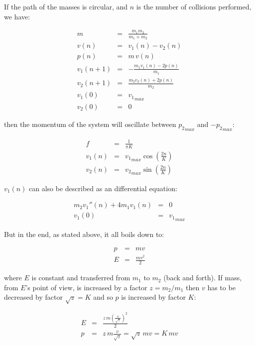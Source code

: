 \documentclass[]{../common/elementary-physics}
\begin{document}
If the path of the masses is circular, and $n$ is the number of collisions performed, we have:

\begin{eqnarray}
m &=& \frac{m_1 m_2}{m_1 + m_2} \\
v(n) &=& v_1(n) - v_2(n) \\
p(n) &=& m \, v(n) \\
v_1(n+1) &=& -\frac{m_1 v_1(n) - 2p(n)}{m_1} \\
v_2(n+1) &=& \frac{m_2 v_2(n) + 2p(n)}{m_2} \\
v_1(0) &=& {v_1}_{max} \\
v_2(0) &=& 0
\end{eqnarray}

then the momentum of the system will oscillate between ${p_2}_{max}$ and $-{p_2}_{max}$:

\begin{eqnarray}
f &=& \frac{1}{\pi K} \\
v_1(n) &=& {v_1}_{max} \cos (\frac{2n}{K}) \\
v_2(n) &=& {v_2}_{max} \sin (\frac{2n}{K})
\end{eqnarray}

$v_1(n)$ can also be described as an differential equation:

\begin{eqnarray}
m_2 v_1''(n) + 4 m_1 v_1(n) &=& 0 \\
v_1(0) &=& {v_1}_{max}
\end{eqnarray}

But in the end, as stated above, it all boils down to:

\begin{eqnarray}
p &=& m v\\
E &=& \frac{m v^2}{2}
\end{eqnarray}

where $E$ is constant and transferred from $m_1$ to $m_2$ (back and forth).
If mass, from $E$'s point of view, is increased by a factor $z=m_2/m_1$ then $v$ has to be decreased by factor $\sqrt{z}=K$ and so $p$ is increased by factor $K$:

\begin{eqnarray}
E &=& \frac{z\,m \left( \frac{v}{\sqrt{z}} \right)^2}{2} \\
p &=& z\,m \frac{v}{\sqrt{z}} = \sqrt{z}\,m v = K\,m v \\
\end{eqnarray}
\end{document}
